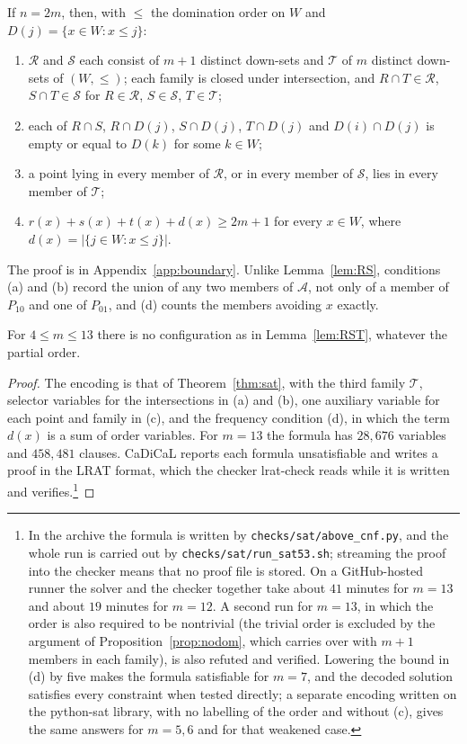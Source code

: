 \documentclass[12pt]{article}
\theoremstyle{plain}
\newcommand{\cA}{\mathcal{A}}
\begin{document}
\begin{lemma}\label{lem:RST}
If $n=2m$, then, with $\le$ the domination order on $W$ and $D(j)=\{x\in W:x\le j\}$:
\begin{enumerate}
\item[(a)] $\mathcal R$ and $\mathcal S$ each consist of $m+1$ distinct down-sets and $\mathcal T$ of $m$ distinct down-sets of $(W,\le)$; each family is closed under intersection, and $R\cap T\in\mathcal R$, $S\cap T\in\mathcal S$ for $R\in\mathcal R$, $S\in\mathcal S$, $T\in\mathcal T$;
\item[(b)] each of $R\cap S$, $R\cap D(j)$, $S\cap D(j)$, $T\cap D(j)$ and $D(i)\cap D(j)$ is empty or equal to $D(k)$ for some $k\in W$;
\item[(c)] a point lying in every member of $\mathcal R$, or in every member of $\mathcal S$, lies in every member of $\mathcal T$;
\item[(d)] $r(x)+s(x)+t(x)+d(x)\ge 2m+1$ for every $x\in W$, where $d(x)=|\{j\in W:x\le j\}|$.
\end{enumerate}
\end{lemma}

The proof is in Appendix~\ref{app:boundary}. Unlike Lemma~\ref{lem:RS}, conditions (a) and (b) record the union of any two members of $\cA$, not only of a member of $P_{10}$ and one of $P_{01}$, and (d) counts the members avoiding $x$ exactly.

\begin{theorem}\label{thm:sat53}
For $4\le m\le 13$ there is no configuration as in Lemma~\ref{lem:RST}, whatever the partial order.
\end{theorem}

\begin{proof}
The encoding is that of Theorem~\ref{thm:sat}, with the third family $\mathcal T$, selector variables for the intersections in (a) and (b), one auxiliary variable for each point and family in (c), and the frequency condition (d), in which the term $d(x)$ is a sum of order variables. For $m=13$ the formula has $28{,}676$ variables and $458{,}481$ clauses. CaDiCaL reports each formula unsatisfiable and writes a proof in the LRAT format, which the checker lrat-check reads while it is written and verifies.\footnote{In the archive \cite{BB26z} the formula is written by \texttt{checks/sat/above\_cnf.py}, and the whole run is carried out by \texttt{checks/sat/run\_sat53.sh}; streaming the proof into the checker means that no proof file is stored. On a GitHub-hosted runner the solver and the checker together take about $41$ minutes for $m=13$ and about $19$ minutes for $m=12$. A second run for $m=13$, in which the order is also required to be nontrivial (the trivial order is excluded by the argument of Proposition~\ref{prop:nodom}, which carries over with $m+1$ members in each family), is also refuted and verified. Lowering the bound in (d) by five makes the formula satisfiable for $m=7$, and the decoded solution satisfies every constraint when tested directly; a separate encoding written on the python-sat library, with no labelling of the order and without (c), gives the same answers for $m=5,6$ and for that weakened case.}
\end{proof}
\end{document}
